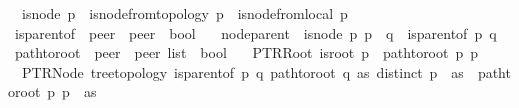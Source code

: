 \begin{isabellebody}
\ \ {\isachardoublequoteopen}is{\isacharunderscore}{\kern0pt}node\ p\ {\isasymequiv}\ is{\isacharunderscore}{\kern0pt}node{\isacharunderscore}{\kern0pt}from{\isacharunderscore}{\kern0pt}topology\ p\ {\isasymor}\ is{\isacharunderscore}{\kern0pt}node{\isacharunderscore}{\kern0pt}from{\isacharunderscore}{\kern0pt}local\ p{\isachardoublequoteclose}%
\isadelimdocument
%
\endisadelimdocument
%
\isatagdocument
%
\isamarkuptrue%
%
\endisatagdocument
{\isafolddocument}%
%
\isadelimdocument
%
\endisadelimdocument
{}\isamarkupfalse%
\ is{\isacharunderscore}{\kern0pt}parent{\isacharunderscore}{\kern0pt}of\ {\isacharcolon}{\kern0pt}{\isacharcolon}{\kern0pt}\ {\isachardoublequoteopen}{\isacharprime}{\kern0pt}peer\ {\isasymRightarrow}\ {\isacharprime}{\kern0pt}peer\ {\isasymRightarrow}\ bool{\isachardoublequoteclose}\ \isanewline
\ \ node{\isacharunderscore}{\kern0pt}parent\ {\isacharcolon}{\kern0pt}\ {\isachardoublequoteopen}{\isasymlbrakk}is{\isacharunderscore}{\kern0pt}node\ p{\isacharsemicolon}{\kern0pt}\ {\isasymG}{\isasymlangle}{\isasymrightarrow}p{\isasymrangle}\ {\isacharequal}{\kern0pt}\ {\isacharbraceleft}{\kern0pt}q{\isacharbraceright}{\kern0pt}{\isasymrbrakk}\ {\isasymLongrightarrow}\ is{\isacharunderscore}{\kern0pt}parent{\isacharunderscore}{\kern0pt}of\ p\ q{\isachardoublequoteclose}%
\isadelimdocument
%
\endisadelimdocument
%
\isatagdocument
%
\isamarkuptrue%
%
\endisatagdocument
{\isafolddocument}%
%
\isadelimdocument
%
\endisadelimdocument
{}\isamarkupfalse%
\ path{\isacharunderscore}{\kern0pt}to{\isacharunderscore}{\kern0pt}root\ {\isacharcolon}{\kern0pt}{\isacharcolon}{\kern0pt}\ {\isachardoublequoteopen}{\isacharprime}{\kern0pt}peer\ {\isasymRightarrow}\ {\isacharprime}{\kern0pt}peer\ list\ {\isasymRightarrow}\ bool{\isachardoublequoteclose}\ \isanewline
\ \ PTRRoot{\isacharcolon}{\kern0pt}\ {\isachardoublequoteopen}{\isasymlbrakk}is{\isacharunderscore}{\kern0pt}root\ p{\isasymrbrakk}\ {\isasymLongrightarrow}\ path{\isacharunderscore}{\kern0pt}to{\isacharunderscore}{\kern0pt}root\ p\ {\isacharbrackleft}{\kern0pt}p{\isacharbrackright}{\kern0pt}{\isachardoublequoteclose}\ {\isacharbar}{\kern0pt}\isanewline
\ \ PTRNode{\isacharcolon}{\kern0pt}\ {\isachardoublequoteopen}{\isasymlbrakk}tree{\isacharunderscore}{\kern0pt}topology{\isacharsemicolon}{\kern0pt}\ is{\isacharunderscore}{\kern0pt}parent{\isacharunderscore}{\kern0pt}of\ p\ q{\isacharsemicolon}{\kern0pt}\ path{\isacharunderscore}{\kern0pt}to{\isacharunderscore}{\kern0pt}root\ q\ as{\isacharsemicolon}{\kern0pt}\ distinct\ {\isacharparenleft}{\kern0pt}p\ {\isacharhash}{\kern0pt}\ as{\isacharparenright}{\kern0pt}{\isasymrbrakk}\ {\isasymLongrightarrow}\ path{\isacharunderscore}{\kern0pt}to{\isacharunderscore}{\kern0pt}root\ p\ {\isacharparenleft}{\kern0pt}p\ {\isacharhash}{\kern0pt}\ as{\isacharparenright}{\kern0pt}{\isachardoublequoteclose}\isanewline

\end{isabellebody}
